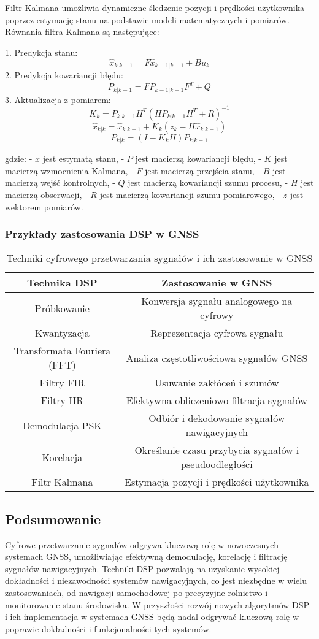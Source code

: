 Filtr Kalmana umożliwia dynamiczne śledzenie pozycji i prędkości użytkownika poprzez estymację stanu na podstawie modeli matematycznych i pomiarów. Równania filtra Kalmana są następujące:

1. Predykcja stanu:
\[ \hat{x}_{k|k-1} = F \hat{x}_{k-1|k-1} + B u_k \]
2. Predykcja kowariancji błędu:
\[ P_{k|k-1} = F P_{k-1|k-1} F^T + Q \]
3. Aktualizacja z pomiarem:
\[ K_k = P_{k|k-1} H^T (H P_{k|k-1} H^T + R)^{-1} \]
\[ \hat{x}_{k|k} = \hat{x}_{k|k-1} + K_k (z_k - H \hat{x}_{k|k-1}) \]
\[ P_{k|k} = (I - K_k H) P_{k|k-1} \]

gdzie:
- $\hat{x}$ jest estymatą stanu,
- $P$ jest macierzą kowariancji błędu,
- $K$ jest macierzą wzmocnienia Kalmana,
- $F$ jest macierzą przejścia stanu,
- $B$ jest macierzą wejść kontrolnych,
- $Q$ jest macierzą kowariancji szumu procesu,
- $H$ jest macierzą obserwacji,
- $R$ jest macierzą kowariancji szumu pomiarowego,
- $z$ jest wektorem pomiarów.

\subsubsection{Przykłady zastosowania DSP w GNSS}

\begin{table}[h!]
\centering
\begin{tabular}{|c|c|}
\hline
\textbf{Technika DSP} & \textbf{Zastosowanie w GNSS} \\
\hline
Próbkowanie & Konwersja sygnału analogowego na cyfrowy \\
Kwantyzacja & Reprezentacja cyfrowa sygnału \\
Transformata Fouriera (FFT) & Analiza częstotliwościowa sygnałów GNSS \\
Filtry FIR & Usuwanie zakłóceń i szumów \\
Filtry IIR & Efektywna obliczeniowo filtracja sygnałów \\
Demodulacja PSK & Odbiór i dekodowanie sygnałów nawigacyjnych \\
Korelacja & Określanie czasu przybycia sygnałów i pseudoodległości \\
Filtr Kalmana & Estymacja pozycji i prędkości użytkownika \\
\hline
\end{tabular}
\caption{Techniki cyfrowego przetwarzania sygnałów i ich zastosowanie w GNSS}
\label{tab:techniques_gnss}
\end{table}

\subsection{Podsumowanie}

Cyfrowe przetwarzanie sygnałów odgrywa kluczową rolę w nowoczesnych systemach GNSS, umożliwiając efektywną demodulację, korelację i filtrację sygnałów nawigacyjnych. Techniki DSP pozwalają na uzyskanie wysokiej dokładności i niezawodności systemów nawigacyjnych, co jest niezbędne w wielu zastosowaniach, od nawigacji samochodowej po precyzyjne rolnictwo i monitorowanie stanu środowiska. W przyszłości rozwój nowych algorytmów DSP i ich implementacja w systemach GNSS będą nadal odgrywać kluczową rolę w poprawie dokładności i funkcjonalności tych systemów.
